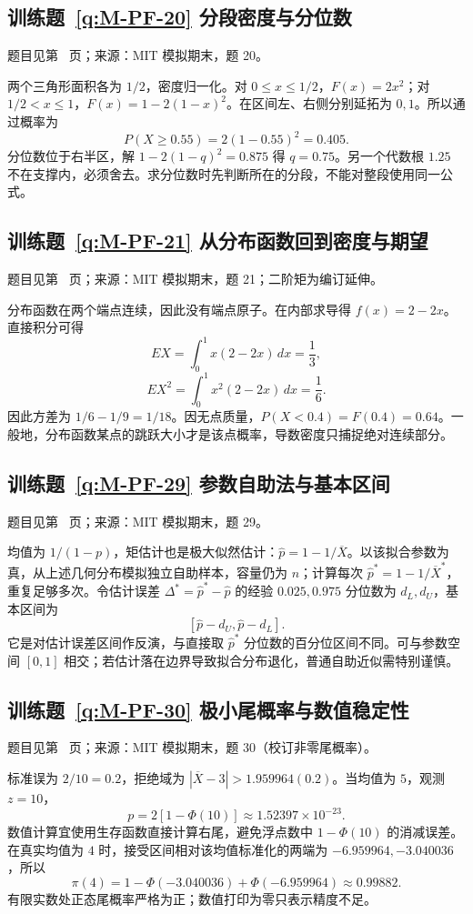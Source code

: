 \subsection*{训练题~\ref{q:M-PF-20} 分段密度与分位数}\label{a:M-PF-20}{\small 题目见第~\pageref{q:M-PF-20} 页；来源：MIT 模拟期末，题 20。}
\begin{solve}两个三角形面积各为 $1/2$，密度归一化。对 $0\le x\le1/2$，$F(x)=2x^2$；对 $1/2<x\le1$，$F(x)=1-2(1-x)^2$。在区间左、右侧分别延拓为 $0,1$。所以通过概率为\[P(X\ge0.55)=2(1-0.55)^2=0.405.\]分位数位于右半区，解 $1-2(1-q)^2=0.875$ 得 $q=0.75$。另一个代数根 $1.25$ 不在支撑内，必须舍去。求分位数时先判断所在的分段，不能对整段使用同一公式。\end{solve}

\subsection*{训练题~\ref{q:M-PF-21} 从分布函数回到密度与期望}\label{a:M-PF-21}{\small 题目见第~\pageref{q:M-PF-21} 页；来源：MIT 模拟期末，题 21；二阶矩为编订延伸。}
\begin{solve}分布函数在两个端点连续，因此没有端点原子。在内部求导得 $f(x)=2-2x$。直接积分可得\[EX=\int_0^1x(2-2x)\,dx=\frac13,\]\[EX^2=\int_0^1x^2(2-2x)\,dx=\frac16.\]因此方差为 $1/6-1/9=1/18$。因无点质量，$P(X<0.4)=F(0.4)=0.64$。一般地，分布函数某点的跳跃大小才是该点概率，导数密度只捕捉绝对连续部分。\end{solve}

\subsection*{训练题~\ref{q:M-PF-29} 参数自助法与基本区间}\label{a:M-PF-29}{\small 题目见第~\pageref{q:M-PF-29} 页；来源：MIT 模拟期末，题 29。}
\begin{solve}均值为 $1/(1-p)$，矩估计也是极大似然估计：$\widehat p=1-1/\overline X$。以该拟合参数为真，从上述几何分布模拟独立自助样本，容量仍为 $n$；计算每次 $\widehat p^*=1-1/\overline X^*$，重复足够多次。令估计误差 $\Delta^*=\widehat p^*-\widehat p$ 的经验 $0.025,0.975$ 分位数为 $d_L,d_U$，基本区间为\[[\widehat p-d_U,\widehat p-d_L].\]它是对估计误差区间作反演，与直接取 $\widehat p^*$ 分位数的百分位区间不同。可与参数空间 $[0,1]$ 相交；若估计落在边界导致拟合分布退化，普通自助近似需特别谨慎。\end{solve}

\subsection*{训练题~\ref{q:M-PF-30} 极小尾概率与数值稳定性}\label{a:M-PF-30}{\small 题目见第~\pageref{q:M-PF-30} 页；来源：MIT 模拟期末，题 30（校订非零尾概率）。}
\begin{solve}标准误为 $2/10=0.2$，拒绝域为 $|\overline X-3|>1.959964(0.2)$。当均值为 $5$，观测 $z=10$，\[p=2[1-\Phi(10)]\approx1.52397\times10^{-23}.\]数值计算宜使用生存函数直接计算右尾，避免浮点数中 $1-\Phi(10)$ 的消减误差。在真实均值为 $4$ 时，接受区间相对该均值标准化的两端为 $-6.959964,-3.040036$，所以\[\pi(4)=1-\Phi(-3.040036)+\Phi(-6.959964)\approx0.99882.\]有限实数处正态尾概率严格为正；数值打印为零只表示精度不足。\end{solve}

